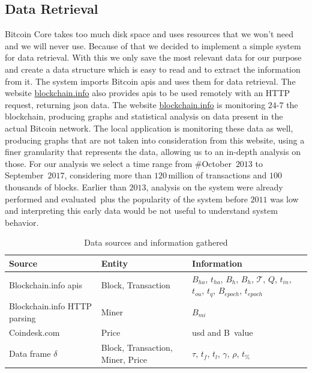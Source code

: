\documentclass[USenglish]{uit-thesis}
\def\bitcoin{\leavevmode\rlap{\hskip.5pt-}B}
\begin{document}
\subsection{Data Retrieval}
\label{sec:dataretrieval}
Bitcoin Core takes too much disk space and uses resources
that we won't need and we will never use. Because of that we
decided to implement a simple system for data retrieval.
With this we only save the most relevant data
for our purpose and create a data structure which
is easy to read and to extract the information from it.
The system imports Bitcoin \gls{api}s and uses
them for data retrieval. The website \url{blockchain.info}
also provides \gls{api}s to be used remotely with an
HTTP request, returning \gls{json} data.
The website \url{blockchain.info} is monitoring $24$-$7$ the blockchain,
producing graphs and
statistical analysis on data present in the
actual Bitcoin network. The local
application is monitoring these data as well,
producing graphs that are not taken into
consideration from this website,
using a finer granularity that represents
the data, allowing us to an in-depth analysis
on those.
For our analysis we select a time range from \#October~$2013$ to
September~$2017$, considering more than $120$\,million of transactions
and $100$\,thousands of blocks. Earlier than $2013$, analysis
on the system were already performed and
evaluated\,\cite{croman2016, RePEc:gat:wpaper:1407,
	Moser2015, Rizun:2015:blocksizelimit}
plus the popularity of the system before
$2011$ was low and interpreting this early data would
be not useful to understand system behavior.
\begin{table}
	\centering
		\caption{Data sources and information gathered}
		\label{tab:datasources}
	\begin{tabular}{|p{3cm}p{3cm}p{4cm}|} \hline
			\textbf{Source}&\textbf{Entity}& \textbf{Information}\\
			\hline
			Blockchain.info \gls{api}s&Block, Transaction&$B_{ha}$, $t_{ha}$, $B_h$, $B_h$, $\mathcal{T}$, $Q$, $t_{in}$, $t_{ou}$, $t_q$, $B_{epoch}$, $t_{epoch}$\\
			\hline
			Blockchain.info HTTP parsing&Miner& $B_{mi}$\\
			\hline
			Coindesk.com&Price&\gls{usd} and \bitcoin~value\\
			\hline
			Data frame $\delta$&Block, Transaction, Miner, Price&$\tau$, $t_f$, $t_l$, $\gamma$, $\rho$, $t_\%$\\
			\hline
		\end{tabular}
\end{table}
\end{document}
